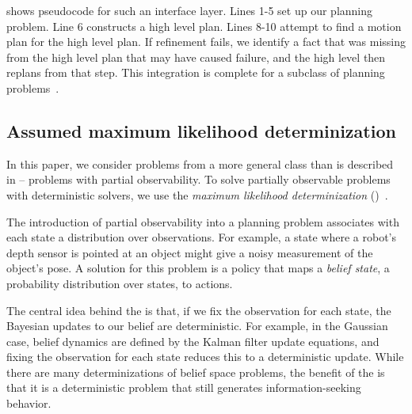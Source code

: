  shows pseudocode for such an interface layer. Lines
1-5 set up our planning problem. Line 6 constructs a high level
plan. Lines 8-10 attempt to find a motion plan for the high level
plan. If refinement fails, we identify a fact that was missing from
the high level plan that may have caused failure, and the high level then
replans from that step.
This integration is complete for a subclass of planning
problems~\cite{srivastava2014combined}.



\subsection{Assumed maximum likelihood determinization}
In this paper, we consider problems from a more general class than is
described in  -- problems with partial
observability. To solve partially observable problems with
deterministic solvers, we use the \emph{maximum
  likelihood determinization} (\mld)~\cite{platt2010belief}.

The introduction of partial observability into a planning problem
associates with each state a distribution over observations. For
example, a state where a robot's depth sensor is pointed at an object
might give a noisy measurement of the object's pose. A solution for
this problem is a policy that maps a \emph{belief state}, a
probability distribution over states, to actions.

The central idea behind the \mld{} is that, if we fix the observation
for each state, the Bayesian updates to our belief are
deterministic. For example, in the Gaussian case, belief dynamics are
defined by the Kalman filter update equations, and fixing the
observation for each state reduces this to a deterministic
update. While there are many determinizations of belief space
problems, the benefit of the \mld{} is that it is a deterministic
problem that still generates information-seeking behavior.

